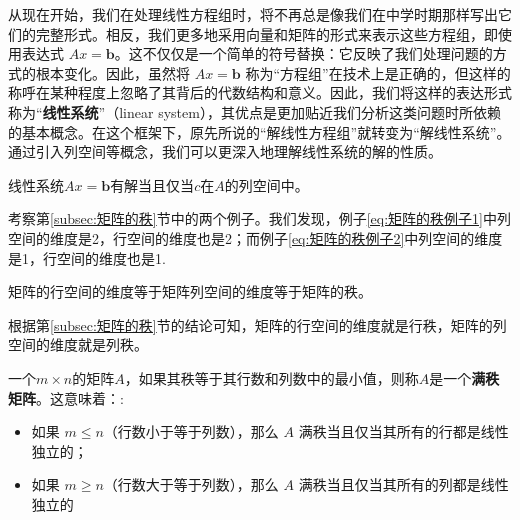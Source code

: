 从现在开始，我们在处理线性方程组时，将不再总是像我们在中学时期那样写出它们的完整形式。相反，我们更多地采用向量和矩阵的形式来表示这些方程组，即使用表达式 $Ax=\boldsymbol{b}$。这不仅仅是一个简单的符号替换：它反映了我们处理问题的方式的根本变化。因此，虽然将 $Ax=\boldsymbol{b}$ 称为“方程组”在技术上是正确的，但这样的称呼在某种程度上忽略了其背后的代数结构和意义。因此，我们将这样的表达形式称为“\textcolor{third}{\bf 线性系统}”（linear system），其优点是更加贴近我们分析这类问题时所依赖的基本概念。在这个框架下，原先所说的“解线性方程组”就转变为“解线性系统”。通过引入列空间等概念，我们可以更深入地理解线性系统的解的性质。

\begin{theorem}
    线性系统$Ax=\boldsymbol{b}$有解当且仅当$c$在$A$的列空间中。
\end{theorem}

考察第\ref{subsec:矩阵的秩}节中的两个例子。我们发现，例子\ref{eq:矩阵的秩例子1}中列空间的维度是2，行空间的维度也是2；而例子\ref{eq:矩阵的秩例子2}中列空间的维度是1，行空间的维度也是1.

\begin{theorem}
    矩阵的行空间的维度等于矩阵列空间的维度等于矩阵的秩。
\end{theorem}

根据第\ref{subsec:矩阵的秩}节的结论可知，矩阵的行空间的维度就是行秩，矩阵的列空间的维度就是列秩。

\begin{definition}[满秩矩阵]
    一个$m\times n$的矩阵$A$，如果其秩等于其行数和列数中的最小值，则称$A$是一个\textcolor{third}{\bf 满秩矩阵}。这意味着：:
    \begin{itemize}
        \item 如果 $m \leq n$（行数小于等于列数），那么 $A$ 满秩当且仅当其所有的行都是线性独立的；
        \item 如果 $m \geq n$（行数大于等于列数），那么 $A$ 满秩当且仅当其所有的列都是线性独立的
    \end{itemize}
\end{definition}


